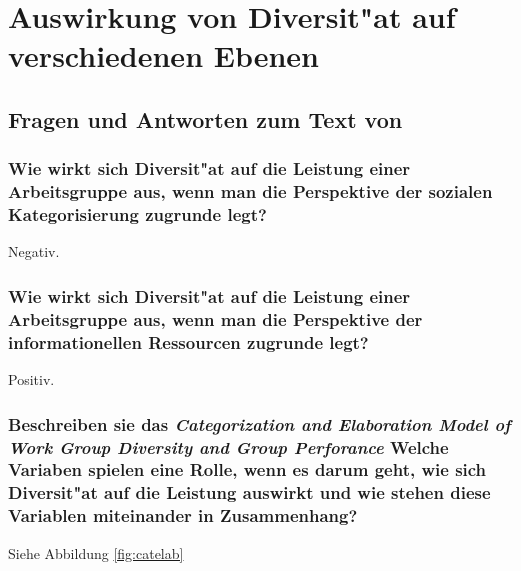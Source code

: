 \section{Auswirkung von Diversit"at auf verschiedenen Ebenen}
\subsection{Fragen und Antworten zum Text von \textcite{van_knippenberg_categorization-elaboration_2010}}
\subsubsection{Wie wirkt sich Diversit"at auf die Leistung einer Arbeitsgruppe aus, wenn man die Perspektive der sozialen Kategorisierung zugrunde legt?}
Negativ.

\subsubsection{Wie wirkt sich Diversit"at auf die Leistung einer Arbeitsgruppe aus, wenn man die Perspektive der informationellen Ressourcen zugrunde legt?}
Positiv.

\subsubsection{Beschreiben sie das \emph{Categorization and Elaboration Model of Work Group Diversity and Group Perforance} Welche Variaben spielen eine Rolle, wenn es darum geht, wie sich Diversit"at auf die Leistung auswirkt und wie stehen diese Variablen miteinander in Zusammenhang?}
Siehe Abbildung \ref{fig:catelab}

